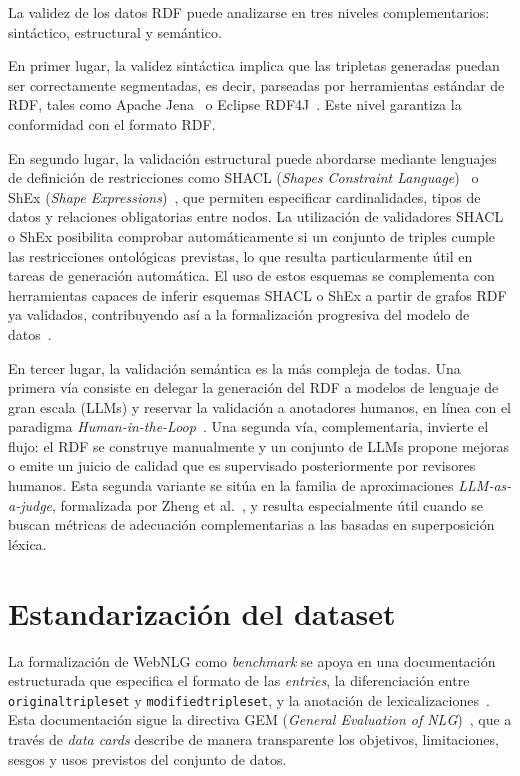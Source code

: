 La validez de los datos RDF puede analizarse en tres niveles complementarios:
sintáctico, estructural y semántico.

En primer lugar, la validez sintáctica implica que las tripletas generadas
puedan ser correctamente segmentadas, es decir, parseadas por herramientas
estándar de RDF, tales como Apache Jena~\cite{ApacheJena} o Eclipse
RDF4J~\cite{EclipseRDF4J}. Este nivel garantiza la conformidad con el formato
RDF.

En segundo lugar, la validación estructural puede abordarse mediante lenguajes
de definición de restricciones como SHACL (\textit{Shapes Constraint
	Language})~\cite{Knublauch2017SHACL} o ShEx (\textit{Shape
	Expressions})~\cite{ValidatingRDF}, que permiten especificar cardinalidades,
tipos de datos y relaciones obligatorias entre nodos. La utilización de
validadores SHACL o ShEx posibilita comprobar automáticamente si un conjunto de
triples cumple las restricciones ontológicas previstas, lo que resulta
particularmente útil en tareas de generación automática. El uso de estos
esquemas se complementa con herramientas capaces de inferir esquemas SHACL o
ShEx a partir de grafos RDF ya validados, contribuyendo así a la formalización
progresiva del modelo de datos~\cite{RDFValidationSurvey2022}.

En tercer lugar, la validación semántica es la más compleja de todas. Una
primera vía consiste en delegar la generación del RDF a modelos de lenguaje de
gran escala (LLMs) y reservar la validación a anotadores humanos, en línea con
el paradigma \textit{Human-in-the-Loop}~\cite{MosqueiraRey2023_HITL}. Una
segunda vía, complementaria, invierte el flujo: el RDF se construye manualmente
y un conjunto de LLMs propone mejoras o emite un juicio de calidad que es
supervisado posteriormente por revisores humanos. Esta segunda variante se
sitúa en la familia de aproximaciones \textit{LLM-as-a-judge}, formalizada por
Zheng et al.~\cite{Zheng2023}, y resulta especialmente útil cuando se buscan
métricas de adecuación complementarias a las basadas en superposición léxica.

\section{Estandarización del dataset}

La formalización de WebNLG como \textit{benchmark} se apoya en una
documentación estructurada que especifica el formato de las \textit{entries},
la diferenciación entre \texttt{original\allowbreak tripleset} y
\texttt{modified\allowbreak tripleset}, y la anotación de
lexicalizaciones~\cite{WebNLGGitHub}. Esta documentación sigue la directiva GEM
(\textit{General Evaluation of NLG})~\cite{GEMWebNLG}, que a través de
\textit{data cards} describe de manera transparente los objetivos,
limitaciones, sesgos y usos previstos del conjunto de datos.

